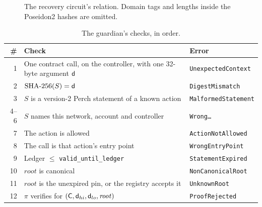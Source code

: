 \begin{figure}[h]
  \centering
  \resizebox{\columnwidth}{!}{}
  \caption{The recovery circuit's relation. Domain tags and lengths inside
    the Poseidon2 hashes are omitted.}
  \label{fig:relation}
\end{figure}

\begin{table}[h]
  \caption{The guardian's checks, in order.}
  \label{tab:guardian}
  \small
  \begin{tabularx}{\columnwidth}{@{}r>{\raggedright\arraybackslash}X l@{}}
    \toprule
    \# & Check & Error \\
    \midrule
    1 & One contract call, on the controller, with one 32-byte argument $\mathsf{d}$ & \texttt{UnexpectedContext} \\
    2 & $\mathrm{SHA\text{-}256}(S) = \mathsf{d}$ & \texttt{DigestMismatch} \\
    3 & $S$ is a version-2 Perch statement of a known action & \texttt{MalformedStatement} \\
    4--6 & $S$ names this network, account and controller & \texttt{Wrong\ldots} \\
    7 & The action is allowed & \texttt{ActionNotAllowed} \\
    8 & The call is that action's entry point & \texttt{WrongEntryPoint} \\
    9 & Ledger $\le$ \texttt{valid\_until\_ledger} & \texttt{StatementExpired} \\
    10 & $\mathit{root}$ is canonical & \texttt{NonCanonicalRoot} \\
    11 & $\mathit{root}$ is the unexpired pin, or the registry accepts it & \texttt{UnknownRoot} \\
    12 & $\pi$ verifies for $(\mathsf{C}, \mathsf{d}_{hi}, \mathsf{d}_{lo}, \mathit{root})$ & \texttt{ProofRejected} \\
    \bottomrule
  \end{tabularx}
\end{table}

